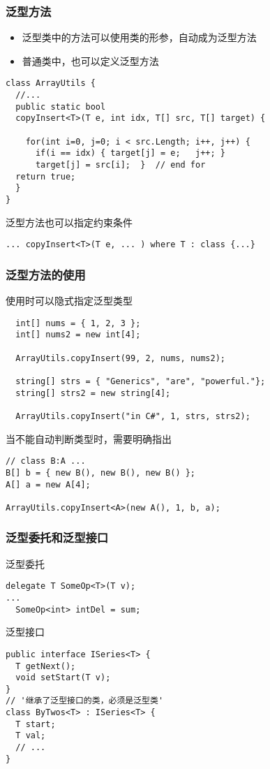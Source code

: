 \begin{frame}[fragile]
\frametitle{泛型方法}
\begin{itemize}
\item 泛型类中的方法可以使用类的形参，自动成为泛型方法
\item 普通类中，也可以定义泛型方法
\end{itemize}
\begin{lstlisting}
class ArrayUtils {
  //...
  public static bool
  copyInsert<T>(T e, int idx, T[] src, T[] target) {

    for(int i=0, j=0; i < src.Length; i++, j++) {
      if(i == idx) { target[j] = e;   j++; }
      target[j] = src[i];  }  // end for
  return true;
  }
}
\end{lstlisting}
泛型方法也可以指定约束条件
\begin{lstlisting}
... copyInsert<T>(T e, ... ) where T : class {...}
\end{lstlisting}
\end{frame}

\begin{frame}[fragile]
\frametitle{泛型方法的使用}
使用时可以隐式指定泛型类型
\begin{lstlisting}
  int[] nums = { 1, 2, 3 };
  int[] nums2 = new int[4];

  ArrayUtils.copyInsert(99, 2, nums, nums2);

  string[] strs = { "Generics", "are", "powerful."};
  string[] strs2 = new string[4];

  ArrayUtils.copyInsert("in C#", 1, strs, strs2);
\end{lstlisting}
\pause 当不能自动判断类型时，需要明确指出
\begin{lstlisting}
// class B:A ...
B[] b = { new B(), new B(), new B() };
A[] a = new A[4];

ArrayUtils.copyInsert<A>(new A(), 1, b, a);
\end{lstlisting}
\end{frame}

\begin{frame}[fragile]
\frametitle{泛型委托和泛型接口}
泛型委托
\begin{lstlisting}
delegate T SomeOp<T>(T v);
...
  SomeOp<int> intDel = sum;
\end{lstlisting}
泛型接口
\begin{lstlisting}[escapeinside='']
public interface ISeries<T> {
  T getNext();
  void setStart(T v);
}
// '继承了泛型接口的类，必须是泛型类'
class ByTwos<T> : ISeries<T> {
  T start;
  T val;
  // ...
}
\end{lstlisting}
\end{frame}

